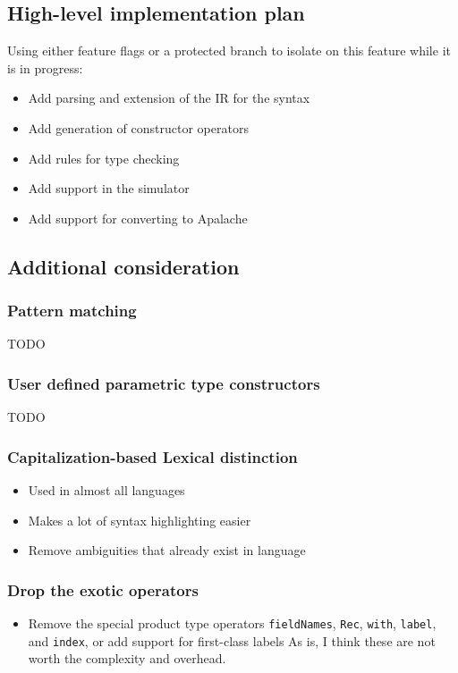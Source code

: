 \documentclass[11pt]{article}
\begin{document}
\subsection{High-level implementation plan}
\label{sec:org778f460}
Using either feature flags or a protected branch to isolate on this feature
while it is in progress:

\begin{itemize}
\item Add parsing and extension of the IR for the syntax
\item Add generation of constructor operators
\item Add rules for type checking
\item Add support in the simulator
\item Add support for converting to Apalache
\end{itemize}
\subsection{Additional consideration}
\label{sec:org54635ad}
\subsubsection{Pattern matching}
\label{sec:orged8fa8c}
TODO
\subsubsection{User defined parametric type constructors}
\label{sec:org3c04b65}
TODO
\subsubsection{Capitalization-based Lexical distinction}
\label{sec:orga960d48}
\begin{itemize}
\item Used in almost all languages
\item Makes a lot of syntax highlighting easier
\item Remove ambiguities that already exist in language
\end{itemize}

\subsubsection{Drop the exotic operators}
\label{sec:org5370d96}
\begin{itemize}
\item Remove the special product type operators \texttt{fieldNames}, \texttt{Rec}, \texttt{with},
\texttt{label}, and \texttt{index}, or add support for first-class labels As is, I
think these are not worth the complexity and overhead.
\end{itemize}
\end{document}
